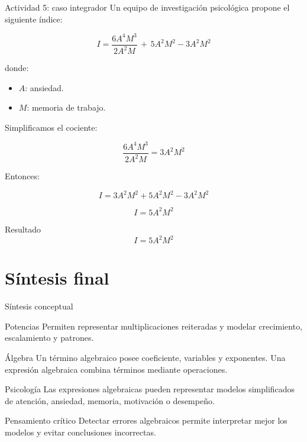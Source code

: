 \documentclass[handout,aspectratio=169]{beamer}
\begin{document}
	
	\begin{frame}{Actividad 5: caso integrador}
		Un equipo de investigación psicológica propone el siguiente índice:
		
		\[
		I=\frac{6A^4M^3}{2A^2M}\,+\,5A^2M^2-3A^2M^2
		\]
		
		donde:
		
		\begin{itemize}
			\item \(A\): ansiedad.
			\item \(M\): memoria de trabajo.
		\end{itemize}
		
		\pause
		
		Simplificamos el cociente:
		
		\[
		\frac{6A^4M^3}{2A^2M}
		=
		3A^2M^2
		\]
		
		\pause
		
		Entonces:
		
		\[
		I=3A^2M^2+5A^2M^2-3A^2M^2
		\]
		
		\pause
		
		\[
		I=5A^2M^2
		\]
		
		\pause
		
		\begin{block}{Resultado}
			\[
			I=5A^2M^2
			\]
		\end{block}
	\end{frame}
	
	\section{Síntesis final}
	
	\begin{frame}{Síntesis conceptual}
		\begin{block}{Potencias}
			Permiten representar multiplicaciones reiteradas y modelar crecimiento, escalamiento y patrones.
		\end{block}
		
		\pause
		
		\begin{block}{Álgebra}
			Un término algebraico posee coeficiente, variables y exponentes.  
			Una expresión algebraica combina términos mediante operaciones.
		\end{block}
		
		\pause
		
		\begin{block}{Psicología}
			Las expresiones algebraicas pueden representar modelos simplificados de atención, ansiedad, memoria, motivación o desempeño.
		\end{block}
		
		\pause
		
		\begin{block}{Pensamiento crítico}
			Detectar errores algebraicos permite interpretar mejor los modelos y evitar conclusiones incorrectas.
		\end{block}
	\end{frame}
	
\end{document}
